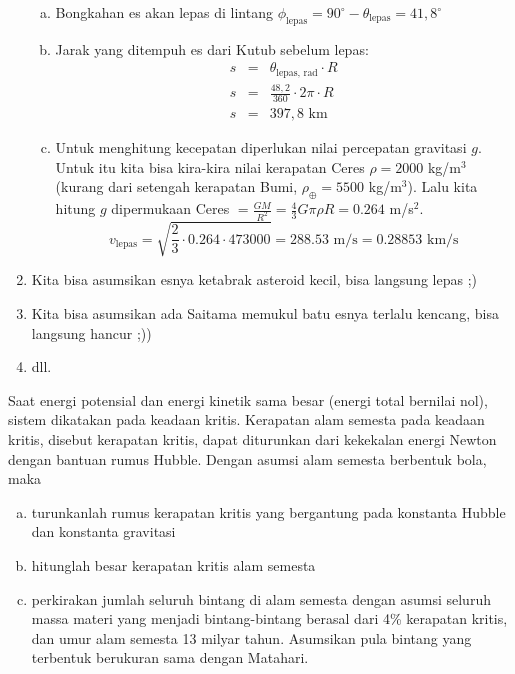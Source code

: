 \documentclass[11pt,fleqn]{exam}
\begin{document}
\begin{questions}
\begin{enumerate}[(1).]
\begin{enumerate}[(a)]
\item Bongkahan es akan lepas di lintang $\phi_{\text{lepas}} = 90^{\circ} - \theta_{\text{lepas}} = 41,8^{\circ}$ 
\item Jarak yang ditempuh es dari Kutub sebelum lepas:
\begin{eqnarray*}
s &=& \theta_{\text{lepas, rad}} \cdot R\\
s &=& \frac{48,2}{360} \cdot 2 \pi \cdot R\\
s &=& 397,8 \text{  km} 
\end{eqnarray*}
\item Untuk menghitung kecepatan diperlukan nilai percepatan gravitasi $g$. Untuk itu kita bisa kira-kira nilai kerapatan Ceres $\rho = 2000$ kg/m$^3$ (kurang dari setengah kerapatan Bumi, $\rho_{\oplus} = 5500$ kg/m$^3$). Lalu kita hitung $g$ dipermukaan Ceres $ = \frac{GM}{R^2} = \frac{4}{3}G \pi \rho R = 0.264$ m/s$^2$.
\begin{equation*}
v_{\text{lepas}} = \sqrt{\frac{2}{3} \cdot 0.264 \cdot 473000} = 288.53 \text{  m/s} = 0.28853 \text{  km/s}
\end{equation*}
\end{enumerate}

\item Kita bisa asumsikan esnya ketabrak asteroid kecil, bisa langsung lepas ;)
\item Kita bisa asumsikan ada Saitama memukul batu esnya terlalu kencang, bisa langsung hancur ;))
\item dll.
\end{enumerate}




\question Saat energi potensial dan energi kinetik sama besar (energi total bernilai nol), sistem dikatakan pada keadaan kritis. Kerapatan alam semesta pada keadaan kritis, disebut kerapatan kritis, dapat diturunkan dari kekekalan energi Newton dengan bantuan rumus Hubble. Dengan asumsi alam semesta berbentuk bola, maka
\begin{enumerate}[(a)]
\item turunkanlah rumus kerapatan kritis yang bergantung pada konstanta Hubble dan konstanta gravitasi
\item hitunglah besar kerapatan kritis alam semesta
\item perkirakan jumlah seluruh bintang di alam semesta dengan asumsi seluruh massa materi yang menjadi bintang-bintang berasal dari 4\% kerapatan kritis, dan umur alam semesta 13 milyar tahun. Asumsikan pula bintang yang terbentuk berukuran sama dengan Matahari.
\end{enumerate}


\end{questions}
\end{document}
